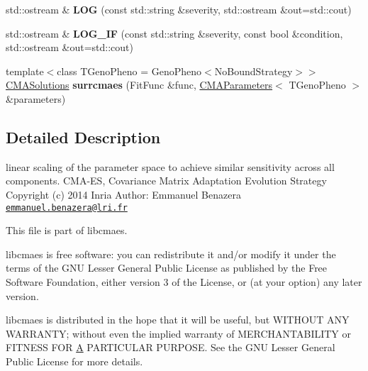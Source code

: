 \begin{DoxyCompactItemize}
\item 
\hypertarget{namespacelibcmaes_a16d45e47c7b936252e380cfbe6809c99}{std\-::ostream \& {\bfseries L\-O\-G} (const std\-::string \&severity, std\-::ostream \&out=std\-::cout)}\label{namespacelibcmaes_a16d45e47c7b936252e380cfbe6809c99}

\item 
\hypertarget{namespacelibcmaes_a3209b3dbcdada9d81d357dedf066b975}{std\-::ostream \& {\bfseries L\-O\-G\-\_\-\-I\-F} (const std\-::string \&severity, const bool \&condition, std\-::ostream \&out=std\-::cout)}\label{namespacelibcmaes_a3209b3dbcdada9d81d357dedf066b975}

\item 
\hypertarget{namespacelibcmaes_ad56249a36fb0f4458e2dba6b9294d79c}{{\footnotesize template$<$class T\-Geno\-Pheno  = Geno\-Pheno$<$\-No\-Bound\-Strategy$>$$>$ }\\\hyperlink{classlibcmaes_1_1CMASolutions}{C\-M\-A\-Solutions} {\bfseries surrcmaes} (Fit\-Func \&func, \hyperlink{classlibcmaes_1_1CMAParameters}{C\-M\-A\-Parameters}$<$ T\-Geno\-Pheno $>$ \&parameters)}\label{namespacelibcmaes_ad56249a36fb0f4458e2dba6b9294d79c}

\end{DoxyCompactItemize}


\subsection{Detailed Description}
linear scaling of the parameter space to achieve similar sensitivity across all components. C\-M\-A-\/\-E\-S, Covariance Matrix Adaptation Evolution Strategy Copyright (c) 2014 Inria Author\-: Emmanuel Benazera \href{mailto:emmanuel.benazera@lri.fr}{\tt emmanuel.\-benazera@lri.\-fr}

This file is part of libcmaes.

libcmaes is free software\-: you can redistribute it and/or modify it under the terms of the G\-N\-U Lesser General Public License as published by the Free Software Foundation, either version 3 of the License, or (at your option) any later version.

libcmaes is distributed in the hope that it will be useful, but W\-I\-T\-H\-O\-U\-T A\-N\-Y W\-A\-R\-R\-A\-N\-T\-Y; without even the implied warranty of M\-E\-R\-C\-H\-A\-N\-T\-A\-B\-I\-L\-I\-T\-Y or F\-I\-T\-N\-E\-S\-S F\-O\-R \hyperlink{classA}{A} P\-A\-R\-T\-I\-C\-U\-L\-A\-R P\-U\-R\-P\-O\-S\-E. See the G\-N\-U Lesser General Public License for more details.

